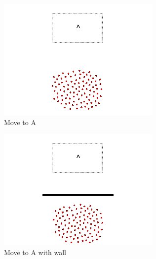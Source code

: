 \documentclass[]{article}
\begin{document}
\begin{figure}
	\centering
	\begin{subfigure}{0.42\textwidth}
		\centering
		\includegraphics[width=\linewidth]{slide_images/Swarm_Robot_Control_-_100_Robot_0003.png}
		\caption{Move to A}
		\label{fig:sub1}
	\end{subfigure}%
	\begin{subfigure}{0.42\textwidth}
		\centering
		\includegraphics[width=\linewidth]{slide_images/Swarm_Robot_Control_-_100_Robot_0005.png}
		\caption{Move to A with wall}
		\label{fig:sub2}
	\end{subfigure}
	\begin{subfigure}{0.42\textwidth}
		\centering

\end{subfigure}
\end{figure}
\end{document}
